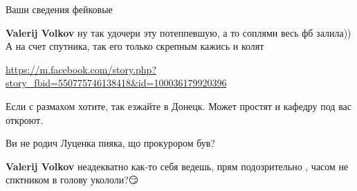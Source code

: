 \begin{itemize}
\begin{itemize}
Ваши сведения фейковые

 
\textbf{Valerij Volkov} ну так удочери эту потеппевшую, а то соплями весь фб залила))
А на счет спутника, так его только скрепным кажись и колят🤣

 
\url{https://m.facebook.com/story.php?story_fbid=550775746138418&id=100036179920396}
\end{itemize}

 
Если с размахом хотите, так езжайте в Донецк. Может простят и кафедру под вас
откроют.

\begin{itemize}
 
Ви не родич Луценка пияка, що прокурором був?

 
\textbf{Valerij Volkov} неадекватно как-то себя ведешь, прям подозрительно , часом не спктником в голову укололи?😏

 

\end{itemize}
\end{itemize}
